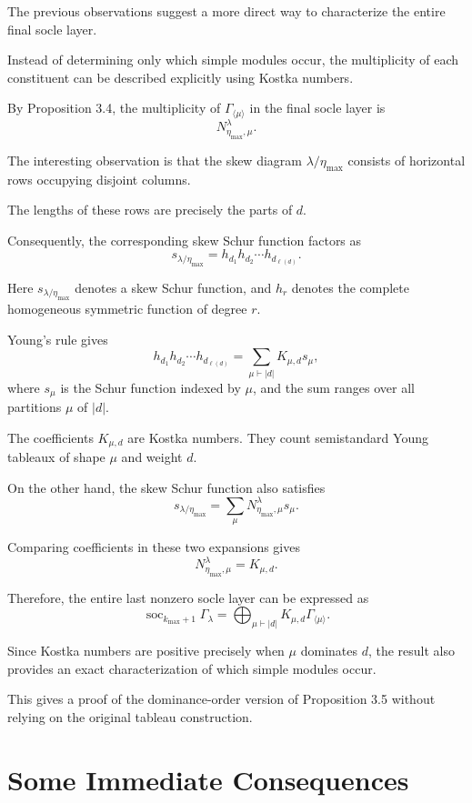 \documentclass[11pt,a4paper]{article}
\begin{document}
The previous observations suggest a more direct
way to characterize the entire final socle layer.

Instead of determining only which simple modules
occur, the multiplicity of each constituent
can be described explicitly using Kostka numbers.

By Proposition 3.4, the multiplicity of
$\Gamma_{\langle\mu\rangle}$ in the final
socle layer is
\[
N^\lambda_{\eta_{\max},\mu}.
\]

The interesting observation is that the skew
diagram $\lambda/\eta_{\max}$ consists of
horizontal rows occupying disjoint columns.

The lengths of these rows are precisely the
parts of $d$.

Consequently, the corresponding skew Schur
function factors as
\[
s_{\lambda/\eta_{\max}}
=
h_{d_1}h_{d_2}\cdots h_{d_{\ell(d)}}.
\]

Here $s_{\lambda/\eta_{\max}}$ denotes a
skew Schur function, and $h_r$ denotes the
complete homogeneous symmetric function
of degree $r$.

Young's rule gives
\[
h_{d_1}h_{d_2}\cdots h_{d_{\ell(d)}}
=
\sum_{\mu\vdash |d|}K_{\mu,d}s_\mu,
\]
where $s_\mu$ is the Schur function indexed
by $\mu$, and the sum ranges over all
partitions $\mu$ of $|d|$.

The coefficients $K_{\mu,d}$ are Kostka numbers.
They count semistandard Young tableaux of
shape $\mu$ and weight $d$.

On the other hand, the skew Schur function
also satisfies
\[
s_{\lambda/\eta_{\max}}
=
\sum_\mu
N^\lambda_{\eta_{\max},\mu}s_\mu.
\]

Comparing coefficients in these two expansions
gives
\[
\boxed{
N^\lambda_{\eta_{\max},\mu}=K_{\mu,d}.
}
\]

Therefore, the entire last nonzero socle layer
can be expressed as
\[
\boxed{
\operatorname{soc}_{k_{\max}+1}\Gamma_\lambda
=
\bigoplus_{\mu\vdash |d|}
K_{\mu,d}\Gamma_{\langle\mu\rangle}.
}
\]

Since Kostka numbers are positive precisely
when $\mu$ dominates $d$, the result also
provides an exact characterization of
which simple modules occur.

This gives a proof of the dominance-order
version of Proposition 3.5 without relying
on the original tableau construction.

\section{Some Immediate Consequences}
\end{document}
